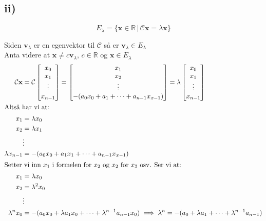 \documentclass[a4paper, norsk, twoside, 10pt]{article}
\begin{document}
\begin{flushleft}
  \subsection*{ii)}

  \[E_{\lambda} = \{\mathbf{x} \in \mathbb{R} \, | \, \mathcal{C} \mathbf{x} = \lambda \mathbf{x}\}\]

  Siden $\mathbf{v}_{\lambda}$ er en egenvektor til $\mathcal{C}$ så er $\mathbf{v}_{\lambda} \in E_{\lambda}$
  \ \\
  Anta videre at $\mathbf{x}  \neq c\mathbf{v}_{\lambda}, \, c \in \mathbb{R}$ og $\mathbf{x} \in E_{\lambda}$
  \begin{align*}
    \mathcal{C}\mathbf{x} &=
    \mathcal{C}\begin{bmatrix}
      x_{0} \\
      x_{1} \\
      \vdots \\
      x_{n-1} \\
    \end{bmatrix}
    = \begin{bmatrix}
      x_{1} \\
      x_{2} \\
      \vdots \\
      -(a_{0}x_{0} + a_{1} + \cdots + a_{n-1}x_{x-1}) \\
    \end{bmatrix}
    = \lambda \begin{bmatrix}
      x_{0} \\
      x_{1} \\
      \vdots \\
      x_{n-1} \\
    \end{bmatrix} \\
    \intertext{Altså har vi at:}
    x_{1} &= \lambda x_{0} \\
    x_{2} &= \lambda x_{1} \\
    &\vdots \\
    \lambda x_{n-1} &= -(a_{0}x_{0} + a_{1}x_{1} + \cdots + a_{n-1}x_{x-1})\\
    \intertext{Setter vi inn $x_{1}$ i formelen for $x_{2}$ og $x_{2}$ for $x_{3}$ osv. Ser vi at:}
    x_{1} &= \lambda x_{0} \\
    x_{2} &= \lambda^{2} x_{0} \\
    &\vdots\\
    \lambda^{n}x_{0} &=-(a_{0}x_{0} + \lambda a_{1}x_{0} + \cdots + \lambda^{n-1}a_{n-1}x_{0}) \implies
    \lambda^{n} = -(a_{0} + \lambda a_{1} + \cdots + \lambda^{n-1}a_{n-1})

\end{align*}
\end{flushleft}
\end{document}
